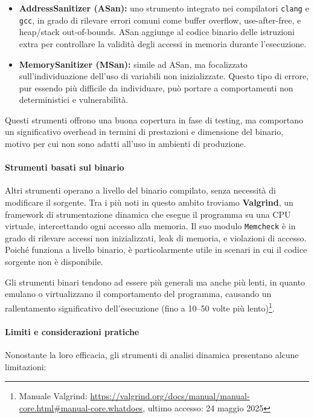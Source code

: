 \begin{itemize}
  \item \textbf{AddressSanitizer (ASan):} uno strumento integrato nei
    compilatori \texttt{clang} e \texttt{gcc}, in grado di rilevare errori comuni
    come buffer overflow, use-after-free, e heap/stack out-of-bounds. ASan
    aggiunge al codice binario delle istruzioni extra per controllare la
    validità degli accessi in memoria durante l'esecuzione.

  \item \textbf{MemorySanitizer (MSan):} simile ad ASan, ma focalizzato sull'individuazione
    dell'uso di variabili non inizializzate. Questo tipo di errore, pur essendo più
    difficile da individuare, può portare a comportamenti non deterministici e
    vulnerabilità.
\end{itemize}

Questi strumenti offrono una buona copertura in fase di testing, ma comportano
un significativo overhead in termini di prestazioni e dimensione del binario, motivo
per cui non sono adatti all'uso in ambienti di produzione.

\paragraph{Strumenti basati sul binario}
Altri strumenti operano a livello del binario compilato, senza necessità di modificare
il sorgente. Tra i più noti in questo ambito troviamo \textbf{Valgrind}, un
framework di strumentazione dinamica che esegue il programma su una CPU virtuale,
intercettando ogni accesso alla memoria. Il suo modulo \texttt{Memcheck} è in grado
di rilevare accessi non inizializzati, leak di memoria, e violazioni di accesso.
Poiché funziona a livello binario, è particolarmente utile in scenari in cui il codice
sorgente non è disponibile.

Gli strumenti binari tendono ad essere più generali ma anche più lenti, in
quanto emulano o virtualizzano il comportamento del programma, causando un rallentamento
significativo dell'esecuzione (fino a 10--50 volte più lento)\footnote{Manuale
Valgrind: \url{https://valgrind.org/docs/manual/manual-core.html\#manual-core.whatdoes},
ultimo accesso: 24 maggio 2025}.

\paragraph{Limiti e considerazioni pratiche}
Nonostante la loro efficacia, gli strumenti di analisi dinamica presentano alcune
limitazioni:


